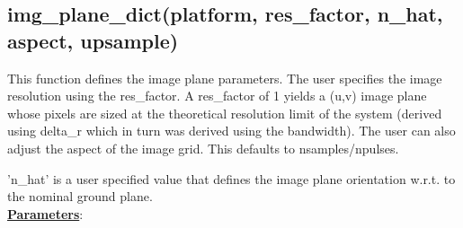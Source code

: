 \documentclass{article}
\begin{document}
\newpage

\subsection{img\_plane\_dict(platform, res\_factor, n\_hat, aspect, upsample)}
\label{sec:img_dict}
This function defines the image plane parameters.  The user specifies the image resolution using the res\_factor.  A res\_factor of 1 yields a (u,v) image plane whose pixels are sized at the theoretical resolution limit of the system (derived using delta\_r which in turn was derived using the bandwidth).  The user can also adjust the aspect of the image grid.  This defaults to nsamples/npulses.

'n\_hat' is a user specified value that defines the image plane orientation w.r.t. to the nominal ground plane.\\

\noindent \underline{\textbf{Parameters}}:
\end{document}
